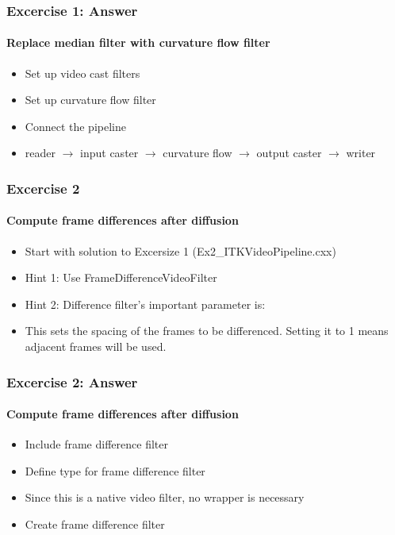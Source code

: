 {
\begin{frame}[fragile]
\frametitle{Excercise 1: Answer}
\framesubtitle{Replace median filter with curvature flow filter}
\begin{itemize}
\item Set up video cast filters
\pause

\item Set up curvature flow filter
\pause

\item Connect the pipeline
\item reader $\rightarrow$ input caster $\rightarrow$ curvature
  flow $\rightarrow$ output caster $\rightarrow$ writer
\end{itemize}
\end{frame}
}


{
\begin{frame}[fragile]
\frametitle{Excercise 2}
\framesubtitle{Compute frame differences after diffusion}
\begin{itemize}
\item Start with solution to Excersize 1 (Ex2\_ITKVideoPipeline.cxx)
\pause

\item Hint 1: Use FrameDifferenceVideoFilter
\pause

\item Hint 2: Difference filter's important parameter is:
\item This sets the spacing of the frames to be differenced. Setting
  it to 1 means adjacent frames will be used.
\end{itemize}
\end{frame}
}

{
\begin{frame}[fragile]
\frametitle{Excercise 2: Answer}
\framesubtitle{Compute frame differences after diffusion}
\begin{itemize}
\item Include frame difference filter
\pause

\item Define type for frame difference filter
\item Since this is a native video filter, no wrapper is necessary
\pause

\item Create frame difference filter
\end{itemize}
\end{frame}
}

